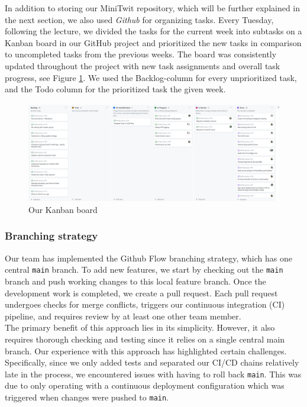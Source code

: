 In addition to storing our MiniTwit repository, which will be further explained in the next section, we also used \textit{Github} for organizing tasks. Every Tuesday, following the lecture, we divided the tasks for the current week into subtasks on a Kanban board in our GitHub project and prioritized the new tasks in comparison to uncompleted tasks from the previous weeks. The board was consistently updated throughout the project with new task assignments and overall task progress, see Figure \ref{fig:kanban}. We used the Backlog-column for every unprioritized task, and the Todo column for the prioritized task the given week. 

\begin{figure}[H]
    \centering
    \includegraphics[width=\linewidth]{images/kanban.png}
    \caption{Our Kanban board}
    \label{fig:kanban}
\end{figure}

\subsubsection{Branching strategy}

Our team has implemented the Github Flow \cite{github_flow} branching strategy, which has one central \texttt{main} branch. To add new features, we start by checking out the \texttt{main} branch and push working changes to this local feature branch. Once the development work is completed, we create a pull request. Each pull request undergoes checks for merge conflicts, triggers our continuous integration (CI) pipeline, and requires review by at least one other team member.\\

The primary benefit of this approach lies in its simplicity. However, it also requires thorough checking and testing since it relies on a single central main branch. Our experience with this approach has highlighted certain challenges. Specifically, since we only added tests and separated our CI/CD chains relatively late in the process, we encountered issues with having to roll back \texttt{main}. This was due to only operating with a continuous deployment configuration which was triggered when changes were pushed to \texttt{main}.  

